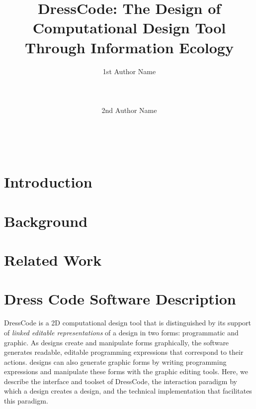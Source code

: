 \documentclass{sigchi}
\begin{document}
\title{DressCode: The Design of Computational Design Tool Through Information Ecology}

\author{
 \alignauthor 1st Author Name\\
  \\
  \\
  \\
 \alignauthor 2nd Author Name\\
  \\
  \\
  \\
}

\maketitle

\begin{abstract}
\end{abstract}



\section{Introduction}
\section{Background}
\section{Related Work}

\section{Dress Code Software Description}
DressCode is a 2D computational design tool that is distinguished by its support of \emph{linked editable representations} of a design in two forms: programmatic and graphic. As designs create and manipulate forms graphically, the software generates readable, editable programming expressions that correspond to their actions. designs can also generate graphic forms by writing programming expressions and manipulate these forms with the graphic editing tools. Here, we describe the interface and toolset of DressCode, the interaction paradigm by which a design creates a design, and the technical implementation that facilitates this paradigm.
\end{document}
